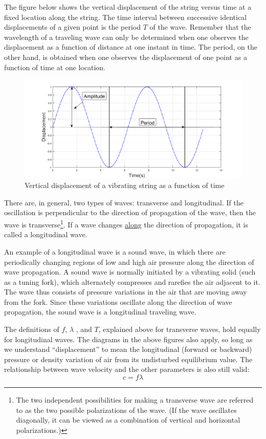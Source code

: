The figure below shows the vertical displacement of the string versus time at a fixed location along the string. The time interval between successive identical displacements of a given point is the period $T$ of the wave. Remember that the wavelength of a traveling wave can only be determined when one observes the displacement as a function of distance at one instant in time. The period, on the other hand, is obtained when one observes the displacement of one point as a function of time at one location.\myskip
\begin{figure}[h]
\centering
\includegraphics[width=1.0\textwidth]{./Exp8/pic/page02.png}
\caption{Vertical displacement of a vibrating string as a function of time}
\end{figure} 

There are, in general, two types of waves: transverse and longitudinal. If the oscillation is perpendicular to the direction of propagation of the wave, then the wave is transverse\footnote{The two independent possibilities for making a transverse wave are referred to as the two possible polarizations of the wave. (If the wave oscillates diagonally, it can be viewed as a combination of vertical and horizontal polarizations.)}. If a wave changes \underline{along} the direction of propagation, it is called a longitudinal wave. \myskip

An example of a longitudinal wave is a sound wave, in which there are periodically changing regions of low and high air pressure along the direction of wave propagation. A sound wave is normally initiated by a vibrating solid (such as a tuning fork), which alternately compresses and rarefies the air adjacent to it. The wave thus consists of pressure variations in the air that are moving away from the fork. Since these variations oscillate along the direction of wave propagation, the sound wave is a longitudinal traveling wave.\myskip

The definitions of $f$, $\lambda$ , and $T$, explained above for transverse waves, hold equally for longitudinal waves. The diagrams in the above figures also apply, so long as we understand ``displacement'' to mean the longitudinal (forward or backward) pressure or density variation of air from its undisturbed equilibrium value. The relationship between wave velocity and the other parameters is also still valid:
\begin{equation}
  c=f\lambda
\end{equation}

